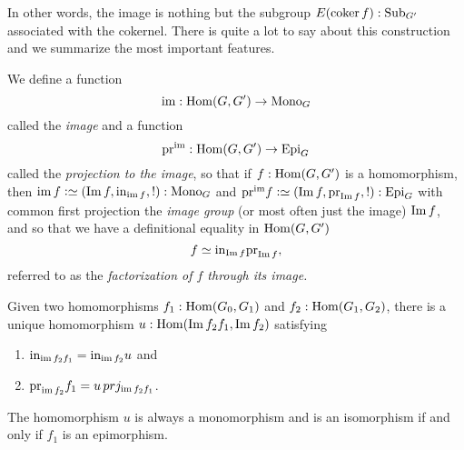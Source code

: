 In other words, the image is nothing but the subgroup $E(\coker f):\typesubgroup_{G'}$ associated with the cokernel.  There is quite a lot to say about this construction and we summarize the most important features.
\begin{construction}\label{con:im}
  We define a function
  $$\img:\Hom(G,G')\to\typemono_G$$
  called the \emph{image} %
  and a function
  $$\prjim:\Hom(G,G')\to\typeepi_G
  $$
  called the \emph{projection to the image},
  so that if  $f:\Hom(G,G')$  is a homomorphism, then
  $\img f\defequi(\Img f,\incl_{\img f},!):\typemono_G$ and
  $\prjim f\defequi(\Img f,\prj_{\Img f},!):\typeepi_G$
  with common first projection the \emph{image group} (or most often just the image) $\Img f$, and so that we have a definitional equality in $\Hom(G,G')$
$$f\oldequiv\incl_{\Img f}\prj_{\Img f},$$
referred to as the \emph{factorization of $f$ through its image.}

Given two homomorphisms $f_1:\Hom(G_0,G_1)$ and $f_2:\Hom(G_1,G_2)$, there is a unique homomorphism
$u:\Hom(\Img f_2f_1,\Img f_2)$ satisfying
\begin{enumerate}
\item $\incl_{\img f_2f_1}=\incl_{\img f_2}u$ and
\item $\prj_{\img f_2}f_1=u\,prj_{\img f_2f_1}$.
\end{enumerate}
The homomorphism $u$ is always a monomorphism and is an isomorphism if and only if  $f_1$ is an epimorphism.


\end{construction}
